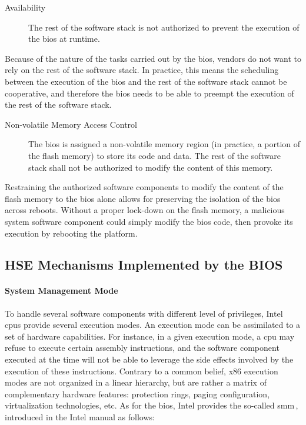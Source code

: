 \begin{description}
\item [Availability]
  The rest of the software stack is not authorized to prevent the execution of
  the \ac{bios} at runtime.
\end{description}

Because of the nature of the tasks carried out by the \ac{bios}, vendors do not
want to rely on the rest of the software stack.
%
In practice, this means the scheduling between the execution of the \ac{bios}
and the rest of the software stack cannot be cooperative, and therefore the
\ac{bios} needs to be able to preempt the execution of the rest of the software
stack.

\begin{description}
\item [Non-volatile Memory Access Control]
  The \ac{bios} is assigned a non-volatile memory region (in practice, a portion
  of the flash memory) to store its code and data.
  The rest of the software stack shall not be authorized to modify the content
  of this memory.
\end{description}

Restraining the authorized software components to modify the content of the
flash memory to the \ac{bios} alone allows for preserving the isolation of the
\ac{bios} across reboots.
%
Without a proper lock-down on the flash memory, a malicious system software
component could simply modify the \ac{bios} code, then provoke its execution by
rebooting the platform.

\subsection{HSE Mechanisms Implemented by the BIOS}
\label{subsec:usecase:hse:smm}

\paragraph{System Management Mode}
%
To handle several software components with different level of privileges, Intel
\acp{cpu} provide several execution modes.
%
An execution mode can be assimilated to a set of hardware capabilities.
%
For instance, in a given execution mode, a \ac{cpu} may refuse to execute
certain assembly instructions, and the software component executed at the time
will not be able to leverage the side effects involved by the execution of these
instructions.
%
Contrary to a common belief, x86 execution modes are not organized in a linear
hierarchy, but are rather a matrix of complementary hardware features:
protection rings, paging configuration, virtualization technologies, etc.
%
As for the \ac{bios}, Intel provides the so-called \ac{smm}\,\cite[Volume 3,
Chapter 34]{intel2014manual}, introduced in the Intel manual as follows:

